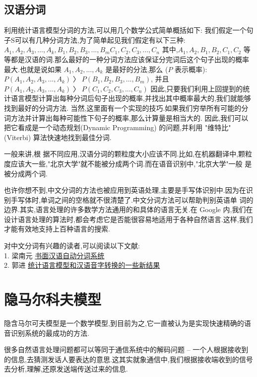 \documentclass{article}
\begin{document}
\subsection{汉语分词}
利用统计语言模型分词的方法,可以用几个数学公式简单概括如下: 我们假定一个句子S可以有几种分词方法,为了简单起见我们假定有以下三种: $A_1, A_2, A_3, ..., A_k, B_1, B_2, B_3, ..., B_m C_1, C_2, C_3, ..., C_n$ 其中,$A_1, A_2, B_1, B_2, C_1, C_2$ 等等都是汉语的词.那么最好的一种分词方法应该保证分完词后这个句子出现的概率最大.也就是说如果 $A_1,A_2,..., A_k$ 是最好的分法,那么 ($P$ 表示概率): $P (A_1, A_2, A_3, ..., A_k) 〉 P (B_1, B_2, B_3, ..., B_m)$, 并且 $P (A_1, A_2, A_3, ..., A_k) 〉 P(C_1, C_2, C_3, ..., C_n)$ 
因此,只要我们利用上回提到的统计语言模型计算出每种分词后句子出现的概率,并找出其中概率最大的,我们就能够找到最好的分词方法. 当然,这里面有一个实现的技巧.如果我们穷举所有可能的分词方法并计算出每种可能性下句子的概率,那么计算量是相当大的.
因此,我们可以把它看成是一个动态规划(Dynamic Programming) 的问题,并利用 "维特比"(Viterbi) 算法快速地找到最佳分词.

一般来讲,根 据不同应用,汉语分词的颗粒度大小应该不同.比如,在机器翻译中,颗粒度应该大一些,"北京大学"就不能被分成两个词.而在语音识别中,"北京大学"一般 是被分成两个词.

也许你想不到,中文分词的方法也被应用到英语处理,主要是手写体识别中.因为在识别手写体时,单词之间的空格就不很清楚了.中文分词方法可以帮助判别英语单 词的边界.其实,语言处理的许多数学方法通用的和具体的语言无关.在 Google 内,我们在设计语言处理的算法时,都会考虑它是否能很容易地适用于各种自然语言.这样,我们才能有效地支持上百种语言的搜索. 

对中文分词有兴趣的读者,可以阅读以下文献:\\
1. 梁南元 \href{http://www.touchwrite.com/demo/LiangNanyuan-JCIP-1987.pdf}{书面汉语自动分词系统}\\
2. 郭进 \href{http://www.touchwrite.com/demo/GuoJin-JCIP-1993.pdf 3. 郭进 Critical Tokenization and its Properties http://acl.ldc.upenn.edu/J/J97/J97-4004.pdf 4. 孙茂松 Chinese word segmentation without using lexicon and hand-crafted training data http://portal.acm.org/citation.cfm?coll=GUIDE&dl=GUIDE&id=980775}{统计语言模型和汉语音字转换的一些新结果}

\section{隐马尔科夫模型}
隐含马尔可夫模型是一个数学模型,到目前为之,它一直被认为是实现快速精确的语音识别系统的最成功的方法.

很多自然语言处理问题都可以等同于通信系统中的解码问题 -- 一个人根据接收到的信息,去猜测发话人要表达的意思.这其实就象通信中,我们根据接收端收到的信号去分析,理解,还原发送端传送过来的信息.
\end{document}
